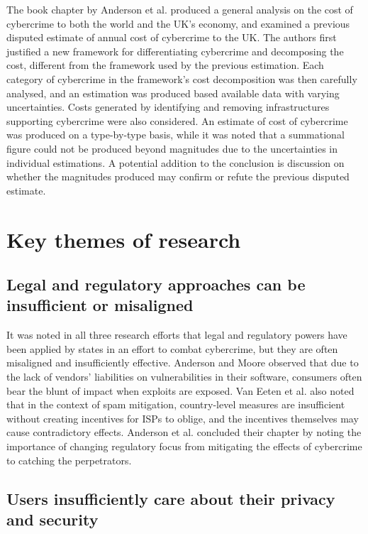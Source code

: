 \documentclass[11pt]{article}
\begin{document}
The book chapter by Anderson et al. \cite{anderson2013measuring} produced a general analysis on the cost of cybercrime to both the world and the UK's economy, and examined a previous disputed estimate of annual cost of cybercrime to the UK. The authors first justified a new framework for differentiating cybercrime and decomposing the cost, different from the framework used by the previous estimation. Each category of cybercrime in the framework's cost decomposition was then carefully analysed, and an estimation was produced based available data with varying uncertainties. Costs generated by identifying and removing infrastructures supporting cybercrime were also considered. An estimate of cost of cybercrime was produced on a type-by-type basis, while it was noted that a summational figure could not be produced beyond magnitudes due to the uncertainties in individual estimations. A potential addition to the conclusion is discussion on whether the magnitudes produced may confirm or refute the previous disputed estimate.

\section{Key themes of research}

\subsection{Legal and regulatory approaches can be insufficient or misaligned}

It was noted in all three research efforts that legal and regulatory powers have been applied by states in an effort to combat cybercrime, but they are often misaligned and insufficiently effective. Anderson and Moore \cite[Sec. 4]{anderson2009information} observed that due to the lack of vendors' liabilities on vulnerabilities in their software, consumers often bear the blunt of impact when exploits are exposed. Van Eeten et al. \cite[p. 13]{van2010role} also noted that in the context of spam mitigation, country-level measures are insufficient without creating incentives for ISPs to oblige, and the incentives themselves may cause contradictory effects. Anderson et al. \cite[12.6]{anderson2013measuring} concluded their chapter by noting the importance of changing regulatory focus from mitigating the effects of cybercrime to catching the perpetrators.

\subsection{Users insufficiently care about their privacy and security}
\end{document}
